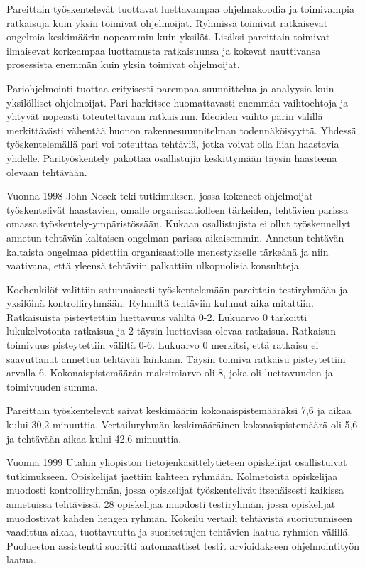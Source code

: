 \documentclass[finnish]{tktltiki2}
\theoremstyle{definition}
\theoremstyle{remark}
\begin{document}
Pareittain työskentelevät tuottavat luettavampaa ohjelmakoodia ja toimivampia ratkaisuja kuin yksin toimivat ohjelmoijat. Ryhmissä toimivat ratkaisevat ongelmia keskimäärin nopeammin kuin yksilöt. Lisäksi pareittain toimivat ilmaisevat korkeampaa luottamusta ratkaisuunsa ja kokevat nauttivansa prosessista enemmän kuin yksin toimivat ohjelmoijat\cite{NOS98}.   

Pariohjelmointi tuottaa erityisesti parempaa suunnittelua ja analyysia kuin yksilölliset ohjelmoijat. Pari harkitsee huomattavasti enemmän vaihtoehtoja ja yhtyvät nopeasti toteutettavaan ratkaisuun. Ideoiden vaihto parin välillä merkittävästi vähentää huonon rakennesuunnitelman todennäköisyyttä.  Yhdessä työskentelemällä pari voi toteuttaa tehtäviä, jotka voivat olla liian haastavia yhdelle. Parityöskentely pakottaa osallistujia keskittymään täysin haasteena olevaan tehtävään\cite{WIL00}.

Vuonna 1998 John Nosek teki tutkimuksen, jossa kokeneet ohjelmoijat työskentelivät haastavien, omalle organisaatiolleen tärkeiden, tehtävien parissa omassa työskentely-ympäristössään. Kukaan osallistujista ei ollut työskennellyt annetun tehtävän kaltaisen ongelman parissa aikaisemmin. Annetun tehtävän kaltaista ongelmaa pidettiin organisaatiolle menestykselle tärkeänä ja niin vaativana, että yleensä tehtäviin palkattiin ulkopuolisia konsultteja\cite{NOS98}.

Koehenkilöt valittiin satunnaisesti työskentelemään pareittain testiryhmään ja yksilöinä kontrolliryhmään.
Ryhmiltä tehtäviin kulunut aika mitattiin. Ratkaisuista pisteytettiin luettavuus väliltä 0-2. Lukuarvo 0 tarkoitti lukukelvotonta ratkaisua ja 2 täysin luettavissa olevaa ratkaisua. Ratkaisun toimivuus pisteytettiin väliltä 0-6. Lukuarvo 0 merkitsi, että ratkaisu ei saavuttanut annettua tehtävää lainkaan. Täysin toimiva ratkaisu pisteytettiin arvolla 6. Kokonaispistemäärän maksimiarvo oli 8, joka oli luettavuuden ja toimivuuden summa\cite{NOS98}.

Pareittain työskentelevät saivat keskimäärin kokonaispistemääräksi 7,6 ja aikaa kului 30,2 minuuttia. Vertailuryhmän keskimääräinen kokonaispistemäärä oli 5,6 ja tehtävään aikaa kului 42,6 minuuttia\cite{NOS98}.

Vuonna 1999 Utahin yliopiston tietojenkäsittelytieteen opiskelijat osallistuivat tutkimukseen. Opiskelijat jaettiin kahteen ryhmään. Kolmetoista opiskelijaa muodosti kontrolliryhmän, jossa opiskelijat työskentelivät itsenäisesti kaikissa annetuissa tehtävissä. 28 opiskelijaa muodosti testiryhmän, jossa opiskelijat muodostivat kahden hengen ryhmän. Kokeilu vertaili tehtävistä suoriutumiseen vaadittua aikaa, tuottavuutta ja suoritettujen tehtävien laatua ryhmien välillä. Puolueeton assistentti suoritti automaattiset testit arvioidakseen ohjelmointityön laatua\cite{WIL00}.
\end{document}
